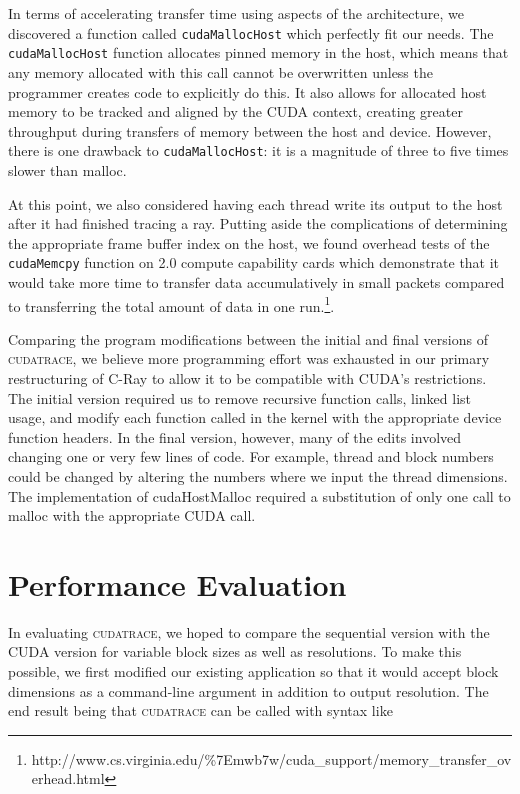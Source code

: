 \documentclass[12pt]{article}
\begin{document}
In terms of accelerating transfer time using aspects of the architecture, we discovered a function called \texttt{cudaMallocHost} which perfectly fit our needs. The \texttt{cudaMallocHost} function allocates pinned memory in the host, which means that any memory allocated with this call cannot be overwritten unless the programmer creates code to explicitly do this. It also allows for allocated host memory to be tracked and aligned by the CUDA context, creating greater throughput during transfers of memory between the host and device. However, there is one drawback to \texttt{cudaMallocHost}: it is a magnitude of three to five times slower than malloc. 

At this point, we also considered having each thread write its output to the host after it had finished tracing a ray. Putting aside the complications of determining the appropriate frame buffer index on the host, we found overhead tests of the \texttt{cudaMemcpy} function on 2.0 compute capability cards which demonstrate that it would take more time to transfer data accumulatively in small packets compared to transferring the total amount of data in one run.\footnote{http://www.cs.virginia.edu/\%7Emwb7w/cuda\_support/memory\_transfer\_overhead.html}.

Comparing the program modifications between the initial and final versions of \textsc{cudatrace}, we believe more programming effort was exhausted in our primary restructuring of C-Ray to allow it to be compatible with CUDA’s restrictions. The initial version required us to remove recursive function calls, linked list usage, and modify each function called in the kernel with the appropriate device function headers. In the final version, however, many of the edits involved changing one or very few lines of code. For example, thread and block numbers could be changed by altering the numbers where we input the thread dimensions. The implementation of cudaHostMalloc required a substitution of only one call to malloc with the appropriate CUDA  call. 

\section{Performance Evaluation}

In evaluating \textsc{cudatrace}, we hoped to compare the sequential version with the CUDA version for variable block sizes as well as resolutions. To make this possible, we first modified our existing application so that it would accept block dimensions as a command-line argument in addition to output resolution. The end result being that \textsc{cudatrace} can be called with syntax like
            
\end{document}
